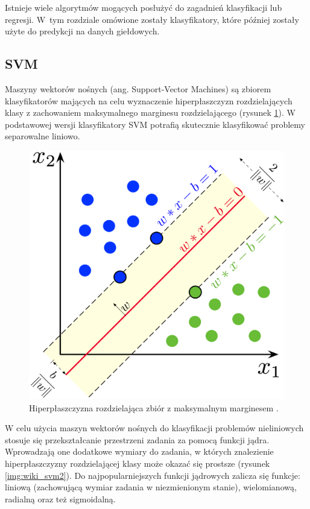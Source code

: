 \documentclass[a4paper, twoside, 11pt, openright]{article}
\begin{document}
Istnieje wiele algorytmów mogących posłużyć do zagadnień klasyfikacji lub regresji. W~tym rozdziale omówione zostały klasyfikatory, które później zostały użyte do predykcji na danych giełdowych.

\subsection{SVM}

Maszyny wektorów nośnych (ang. Support-Vector Machines)\cite{svm} są zbiorem klasyfikatorów mających na celu wyznaczenie hiperpłaszczyzn rozdzielających klasy z zachowaniem maksymalnego marginesu rozdzielającego (rysunek \ref{img:wiki_svm}). W podstawowej wersji klasyfikatory SVM potrafią skutecznie klasyfikować problemy separowalne liniowo.


\begin{figure}[H]
\centering \includegraphics[scale=0.9]{img/svm.png}
\caption{Hiperpłaszczyzna rozdzielająca zbiór z maksymalnym marginesem \cite{wikisvm}.}
\label{img:wiki_svm}
\end{figure}

W celu użycia maszyn wektorów nośnych do klasyfikacji problemów nieliniowych stosuje się przekształcanie przestrzeni zadania za pomocą funkcji jądra. Wprowadzają one dodatkowe wymiary do zadania, w których znalezienie hiperpłaszczyzny rozdzielającej klasy może okazać się prostsze (rysunek \ref{img:wiki_svm2}). Do najpopularniejszych funkcji jądrowych zalicza się funkcje: liniową (zachowującą wymiar zadania w niezmienionym stanie), wielomianową, radialną oraz też sigmoidalną.
\end{document}
